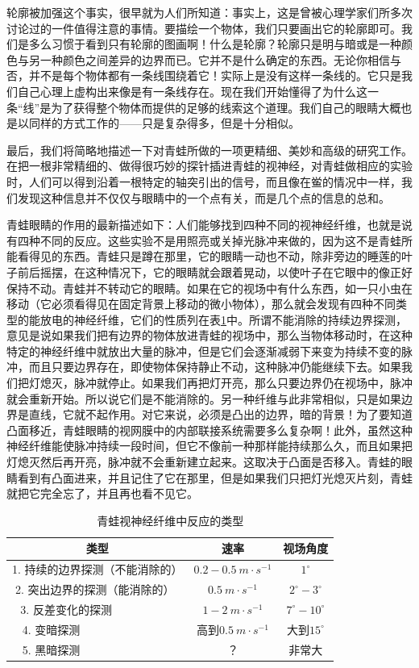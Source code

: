 轮廓被加强这个事实，很早就为人们所知道：事实上，这是曾被心理学家们所多次讨论过的一件值得注意的事情。要描绘一个物体，我们只要画出它的轮廓即可。我们是多么习惯于看到只有轮廓的图画啊！什么是轮廓？轮廓只是明与暗或是一种颜色与另一种颜色之间差异的边界而已。它并不是什么确定的东西。无论你相信与否，并不是每个物体都有一条线围绕着它！实际上是没有这样一条线的。它只是我们自己心理上虚构出来像是有一条线存在。现在我们开始懂得了为什么这一条“线”是为了获得整个物体而提供的足够的线索这个道理。我们自己的眼睛大概也是以同样的方式工作的——只是复杂得多，但是十分相似。

最后，我们将简略地描述一下对青蛙所做的一项更精细、美妙和高级的研究工作。在把一根非常精细的、做得很巧妙的探针插进青蛙的视神经，对青蛙做相应的实验时，人们可以得到沿着一根特定的轴突引出的信号，而且像在鲎的情况中一样，我们发现这种信息并不仅仅与眼睛中的一个点有关，而是几个点的信息的总和。

青蛙眼睛的作用的最新描述如下：人们能够找到四种不同的视神经纤维，也就是说有四种不同的反应。这些实验不是用照亮或关掉光脉冲来做的，因为这不是青蛙所能看得见的东西。青蛙只是蹲在那里，它的眼睛一动也不动，除非旁边的睡莲的叶子前后摇摆，在这种情况下，它的眼睛就会跟着晃动，以使叶子在它眼中的像正好保持不动。青蛙并不转动它的眼睛。如果在它的视场中有什么东西，如一只小虫在移动（它必须看得见在固定背景上移动的微小物体），那么就会发现有四种不同类型的能放电的神经纤维，它们的性质列在表\ref{Table:36:1}中。所谓不能消除的持续边界探测，意见是说如果我们把有边界的物体放进青蛙的视场中，那么当物体移动时，在这种特定的神经纤维中就放出大量的脉冲，但是它们会逐渐减弱下来变为持续不变的脉冲，而且只要边界存在，即使物体保持静止不动，这种脉冲仍能继续下去。如果我们把灯熄灭，脉冲就停止。如果我们再把灯开亮，那么只要边界仍在视场中，脉冲就会重新开始。所以说它们是不能消除的。另一种纤维与此非常相似，只是如果边界是直线，它就不起作用。对它来说，必须是凸出的边界，暗的背景！为了要知道凸面移近，青蛙眼睛的视网膜中的内部联接系统需要多么复杂啊！此外，虽然这种神经纤维能使脉冲持续一段时间，但它不像前一种那样能持续那么久，而且如果把灯熄灭然后再开亮，脉冲就不会重新建立起来。这取决于凸面是否移入。青蛙的眼睛看到有凸面进来，并且记住了它在那里，但是如果我们只把灯光熄灭片刻，青蛙就把它完全忘了，并且再也看不见它。

\begin{table}[!ht]
    \centering
    \caption{青蛙视神经纤维中反应的类型}
    \label{Table:36:1}
    \begin{tabular}{|c|c|c|}
    \hline
        类型 & 速率 & 视场角度  \\ \hline
        1. 持续的边界探测（不能消除的） & $0.2-0.5~m\cdot s^{-1}$ & $1^\circ$  \\ \hline
        2. 突出边界的探测（能消除的）$~~$ & $0.5~m\cdot s^{-1}$ & $2^\circ - 3^\circ$  \\ \hline
        3. 反差变化的探测$~~~~~~~~~~~~~~~~~~~~~~~~~$ & $1-2~m\cdot s^{-1}$ & $7^\circ - 10^\circ$  \\ \hline
        4. 变暗探测$~~~~~~~~~~~~~~~~~~~~~~~~~~~~~~~~~~~~~$ & 高到$0.5~m\cdot s^{-1}$ & 大到$15^\circ$  \\ \hline
        5. 黑暗探测$~~~~~~~~~~~~~~~~~~~~~~~~~~~~~~~~~~~~~$ & ？ & 非常大  \\ \hline
    \end{tabular}
\end{table}


